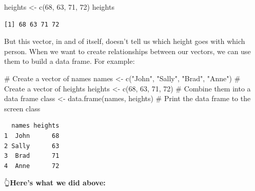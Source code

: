 \documentclass[
  letterpaper,
  DIV=11,
  numbers=noendperiod]{scrreprt}
\newenvironment{Shaded}{\begin{snugshade}}{\end{snugshade}}
\newcommand{\CommentTok}[1]{\textcolor[rgb]{0.37,0.37,0.37}{#1}}
\newcommand{\DecValTok}[1]{\textcolor[rgb]{0.68,0.00,0.00}{#1}}
\newcommand{\FunctionTok}[1]{\textcolor[rgb]{0.28,0.35,0.67}{#1}}
\newcommand{\NormalTok}[1]{\textcolor[rgb]{0.00,0.23,0.31}{#1}}
\newcommand{\OtherTok}[1]{\textcolor[rgb]{0.00,0.23,0.31}{#1}}
\newcommand{\StringTok}[1]{\textcolor[rgb]{0.13,0.47,0.30}{#1}}
\begin{document}
\begin{Shaded}
\begin{Highlighting}[]
\NormalTok{heights }\OtherTok{\textless{}{-}} \FunctionTok{c}\NormalTok{(}\DecValTok{68}\NormalTok{, }\DecValTok{63}\NormalTok{, }\DecValTok{71}\NormalTok{, }\DecValTok{72}\NormalTok{)}
\NormalTok{heights}
\end{Highlighting}
\end{Shaded}

\begin{verbatim}
[1] 68 63 71 72
\end{verbatim}

But this vector, in and of itself, doesn't tell us which height goes
with which person. When we want to create relationships between our
vectors, we can use them to build a data frame. For example:

\begin{Shaded}
\begin{Highlighting}[]
\CommentTok{\# Create a vector of names}
\NormalTok{names }\OtherTok{\textless{}{-}} \FunctionTok{c}\NormalTok{(}\StringTok{"John"}\NormalTok{, }\StringTok{"Sally"}\NormalTok{, }\StringTok{"Brad"}\NormalTok{, }\StringTok{"Anne"}\NormalTok{)}
\CommentTok{\# Create a vector of heights}
\NormalTok{heights }\OtherTok{\textless{}{-}} \FunctionTok{c}\NormalTok{(}\DecValTok{68}\NormalTok{, }\DecValTok{63}\NormalTok{, }\DecValTok{71}\NormalTok{, }\DecValTok{72}\NormalTok{)}
\CommentTok{\# Combine them into a data frame}
\NormalTok{class }\OtherTok{\textless{}{-}} \FunctionTok{data.frame}\NormalTok{(names, heights)}
\CommentTok{\# Print the data frame to the screen}
\NormalTok{class}
\end{Highlighting}
\end{Shaded}

\begin{verbatim}
  names heights
1  John      68
2 Sally      63
3  Brad      71
4  Anne      72
\end{verbatim}

👆\textbf{Here's what we did above:}
\end{document}
